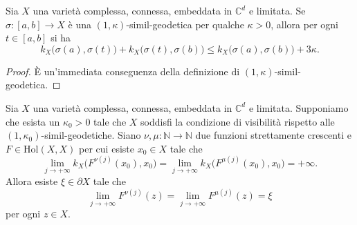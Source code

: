 \begin{lm} \label{quasiovvio}
    Sia $X$ una varietà complessa, connessa, embeddata in $\mathbb{C}^d$ e limitata. Se $\sigma:[a,b] \longrightarrow X$ è una $(1,\kappa)$-simil-geodetica per qualche $\kappa>0$, allora per ogni $t \in [a,b]$ si ha
    $$k_X\big(\sigma(a),\sigma(t)\big)+k_X\big(\sigma(t),\sigma(b)\big) \le k_X\big(\sigma(a),\sigma(b)\big)+3\kappa.$$
\end{lm}

\begin{proof}
    È un'immediata conseguenza della definizione di $(1,\kappa)$-simil-geodetica.
\end{proof}

\begin{prop} \label{inf_impl_ugu}
    Sia $X$ una varietà complessa, connessa, embeddata in $\mathbb{C}^d$ e limitata. Supponiamo che esista un $\kappa_0>0$ tale che $X$ soddisfi la condizione di visibilità rispetto alle $(1,\kappa_0)$-simil-geodetiche. Siano $\nu,\mu:\mathbb{N}\longrightarrow\mathbb{N}$ due funzioni strettamente crescenti e $F\in\text{Hol}(X,X)$ per cui esiste $x_0 \in X$ tale che
    $$\lim_{j\longrightarrow+\infty} k_X\big(F^{\nu(j)}(x_0),x_0\big)=\lim_{j\longrightarrow+\infty} k_X\big(F^{\mu(j)}(x_0),x_0\big)=+\infty.$$
    Allora esiste $\xi\in\partial X$ tale che
    $$\lim_{j\longrightarrow+\infty} F^{\nu(j)}(z)=\lim_{j\longrightarrow+\infty} F^{\mu(j)}(z)=\xi$$
    per ogni $z \in X$.
\end{prop}

